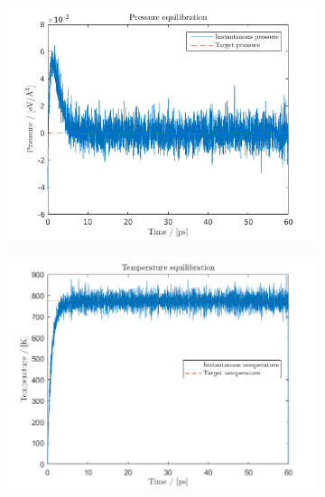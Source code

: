 \begin{figure}[H]
    \centering
    \captionsetup[subfigure]{justification=centering}
    \begin{subfigure}[b]{0.40\textwidth}
        \centering
        \includegraphics[width=\textwidth]{graphics/task3/pressure.png}
    \end{subfigure}
    \begin{subfigure}[b]{0.40\textwidth}
        \centering
        \includegraphics[width=\textwidth]{graphics/task3/temperature.png}
    \end{subfigure}
    \begin{subfigure}[b]{0.40\textwidth}
        \centering

\end{subfigure}
\end{figure}
